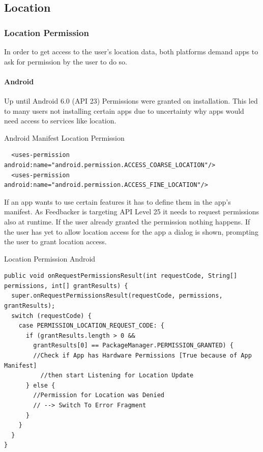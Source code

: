 \subsection{Location}
\subsubsection{Location Permission}
In order to get access to the user's location data, both platforms demand apps to ask for permission by the user to do so.

\paragraph{Android}
Up until Android 6.0 (API 23) Permissions were granted on installation. This led to many users not installing certain apps due to uncertainty why apps would need access to services like location.\\

\begin{listing}[H]
  \caption{Android Manifest Location Permission}
  \label{mint:manifest_and}
  \begin{verbatim}
  <uses-permission android:name="android.permission.ACCESS_COARSE_LOCATION"/>
  <uses-permission android:name="android.permission.ACCESS_FINE_LOCATION"/>
  \end{verbatim}
\end{listing}
If an app wants to use certain features it has to define them in the app's manifest. As Feedbacker is targeting API Level 25 it needs to request permissions also at runtime. If the user already granted the permission nothing happens. If the user has yet to allow location access for the app a dialog is shown, prompting the user to grant location access.\\

\begin{listing}[H]
  \caption{Location Permission Android}
  \label{mint:loc_perm_and}
  \begin{verbatim}
public void onRequestPermissionsResult(int requestCode, String[] permissions, int[] grantResults) {
  super.onRequestPermissionsResult(requestCode, permissions, grantResults);
  switch (requestCode) {
    case PERMISSION_LOCATION_REQUEST_CODE: {
      if (grantResults.length > 0 &&
        grantResults[0] == PackageManager.PERMISSION_GRANTED) {
        //Check if App has Hardware Permissions [True because of App Manifest]
          //then start Listening for Location Update
      } else {
        //Permission for Location was Denied
        // --> Switch To Error Fragment
      }
    }
  }
}
  \end{verbatim}
\end{listing}


